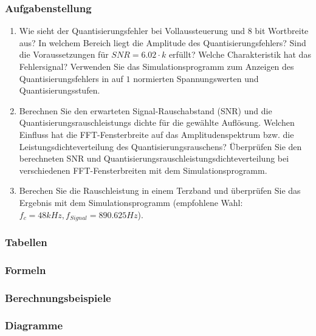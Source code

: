 \subsubsection{Aufgabenstellung}
\begin{enumerate}
\item Wie sieht der Quantisierungsfehler bei Vollaussteuerung und $8$ bit Wortbreite aus? In welchem Bereich liegt die Amplitude des Quantisierungsfehlers? Sind die Voraussetzungen für $SNR = 6.02 \cdot k$ erfüllt? Welche Charakteristik hat das Fehlersignal? Verwenden Sie das Simulationsprogramm zum Anzeigen des Quantisierungsfehlers in auf $1$ normierten Spannungswerten und Quantisierungsstufen. 
\item Berechnen Sie den erwarteten Signal-Rauschabstand (SNR) und die Quantisierungsrauschleistungs dichte für die gewählte Auflösung. Welchen Einfluss hat die FFT-Fensterbreite auf das Amplitudenspektrum bzw. die Leistungsdichteverteilung des Quantisierungsrauschens?
Überprüfen Sie den berechneten SNR und Quantisierungsrauschleistungsdichteverteilung bei verschiedenen FFT-Fensterbreiten mit dem Simulationsprogramm. 
\item Berechen Sie die Rauschleistung in einem Terzband und überprüfen Sie das Ergebnis mit dem Simulationsprogramm (empfohlene Wahl: $f_c = 48kHz, f_{Signal} = 890.625Hz$). 
\end{enumerate}



\subsubsection{Tabellen}

\subsubsection{Formeln}

\subsubsection{Berechnungsbeispiele}

\subsubsection{Diagramme}

